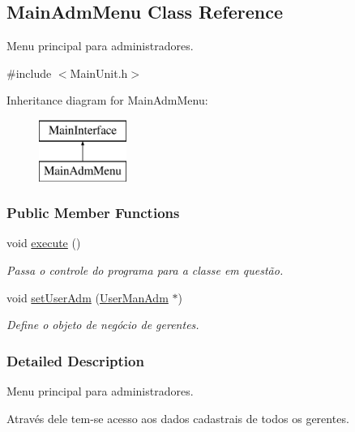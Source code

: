 \hypertarget{classMainAdmMenu}{\subsection{Main\-Adm\-Menu Class Reference}
\label{d9/d86/classMainAdmMenu}
}


Menu principal para administradores.  




{\ttfamily \#include $<$Main\-Unit.\-h$>$}

Inheritance diagram for Main\-Adm\-Menu\-:\begin{figure}[H]
\begin{center}
\leavevmode
\includegraphics[height=2.000000cm]{d9/d86/classMainAdmMenu}
\end{center}
\end{figure}
\subsubsection*{Public Member Functions}
\begin{DoxyCompactItemize}
\item 
void \hyperlink{classMainAdmMenu_aa0c46ea4cc61cddfc75e7eb03f549832}{execute} ()
\begin{DoxyCompactList}\small\item\em Passa o controle do programa para a classe em questão. \end{DoxyCompactList}\item 
void \hyperlink{classMainAdmMenu_a86c57f1f8d9762ee6efbadef3f990f67}{set\-User\-Adm} (\hyperlink{classUserManAdm}{User\-Man\-Adm} $\ast$)
\begin{DoxyCompactList}\small\item\em Define o objeto de negócio de gerentes. \end{DoxyCompactList}\end{DoxyCompactItemize}


\subsubsection{Detailed Description}
Menu principal para administradores. 

Através dele tem-\/se acesso aos dados cadastrais de todos os gerentes. 

